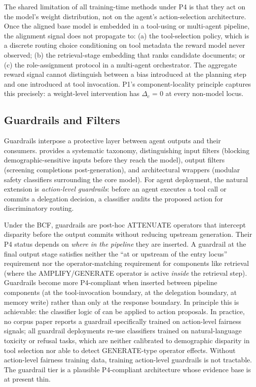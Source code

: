 \documentclass[acmsmall,nonacm]{acmart}
\begin{document}
The shared limitation of all training-time methods under P4 is that they act on the model's weight distribution, not on the agent's action-selection architecture. Once the aligned base model is embedded in a tool-using or multi-agent pipeline, the alignment signal does not propagate to: (a) the tool-selection policy, which is a discrete routing choice conditioning on tool metadata the reward model never observed; (b) the retrieval-stage embedding that ranks candidate documents; or (c) the role-assignment protocol in a multi-agent orchestrator. The aggregate reward signal cannot distinguish between a bias introduced at the planning step and one introduced at tool invocation. P1's component-locality principle captures this precisely: a weight-level intervention has $\Delta_c$ = 0 at every non-model locus.

\subsection{Guardrails and Filters}

Guardrails interpose a protective layer between agent outputs and their consumers. \cite{dong2024building} provides a systematic taxonomy, distinguishing input filters (blocking demographic-sensitive inputs before they reach the model), output filters (screening completions post-generation), and architectural wrappers (modular safety classifiers surrounding the core model). For agent deployment, the natural extension is \emph{action-level guardrails}: before an agent executes a tool call or commits a delegation decision, a classifier audits the proposed action for discriminatory routing.

Under the BCF, guardrails are post-hoc ATTENUATE operators that intercept disparity before the output commits without reducing upstream generation. Their P4 status depends on \emph{where in the pipeline} they are inserted. A guardrail at the final output stage satisfies neither the ``at or upstream of the entry locus'' requirement nor the operator-matching requirement for components like retrieval (where the AMPLIFY/GENERATE operator is active \emph{inside} the retrieval step). Guardrails become more P4-compliant when inserted between pipeline components (at the tool-invocation boundary, at the delegation boundary, at memory write) rather than only at the response boundary. In principle this is achievable: the classifier logic of \cite{dong2024building} can be applied to action proposals. In practice, no corpus paper reports a guardrail specifically trained on action-level fairness signals; all guardrail deployments re-use classifiers trained on natural-language toxicity or refusal tasks, which are neither calibrated to demographic disparity in tool selection nor able to detect GENERATE-type operator effects. Without action-level fairness training data, training action-level guardrails is not tractable. The guardrail tier is a plausible P4-compliant architecture whose evidence base is at present thin.
\end{document}
